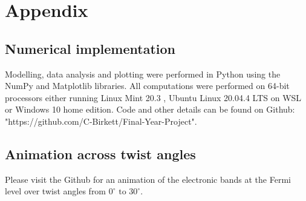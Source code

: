 \documentclass[12pt]{report} %
\begin{document}

%


\clearpage

\section*{Appendix}


\subsection*{Numerical implementation}
  Modelling, data analysis and plotting were performed in Python using the NumPy and Matplotlib libraries. All computations were performed on 64-bit processors either running Linux Mint 20.3 , Ubuntu Linux 20.04.4 LTS on WSL or Windows 10 home edition. Code and other details can be found on Github: "https://github.com/C-Birkett/Final-Year-Project".

\subsection*{Animation across twist angles}
Please visit the Github for an animation of the electronic bands at the Fermi level over twist angles from $0^\circ \text{ to } 30^\circ$.


\begin{lstlisting}

\end{lstlisting}
\end{document}
